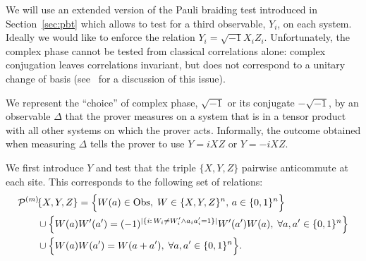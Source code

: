 We will use an extended version of the Pauli braiding test introduced in Section~\ref{sec:pbt} which allows to test for a third observable, $Y_i$, on each system. Ideally we would like to enforce the relation $Y_i=\sqrt{-1}X_iZ_i$. Unfortunately, the complex phase cannot be tested from classical correlations alone: complex conjugation leaves correlations invariant, but does not correspond to a unitary change of basis  (see~\cite[Appendix A]{reichardt2012classicalarxiv} for a discussion of this issue). 

We represent the ``choice'' of complex phase, $\sqrt{-1}$ or its conjugate $-\sqrt{-1}$, by an observable $\Delta$ that the prover measures on a system that is in a tensor product with all other systems on which the prover acts. Informally, the outcome obtained when measuring $\Delta$ tells the prover to use $Y = i XZ$ or $Y=-iXZ$. 

We first introduce $Y$ and test that the triple $\{X,Y,Z\}$ pairwise anticommute at each site. This corresponds to the following set of relations: 
\begin{align*}
& {\mathcal{P}^{(m)}\!}\{X,Y,Z\} = \Big\{ W(a)\in\mathrm{Obs},\;W \in \{X,Y,Z\}^n,\,a\in\{0,1\}^n\Big\} \\
&\qquad\cup \Big\{W(a)W'(a')=(-1)^{|\{i:\,W_i\neq W'_i \wedge a_ia'_i=1\}|} W'(a')W(a),\;\forall a,a'\in\{0,1\}^n\Big\}\\
&\qquad \cup\Big\{ W(a)W(a')=W(a+a'),\;\forall a,a'\in\{0,1\}^n\Big\}.
\end{align*}


